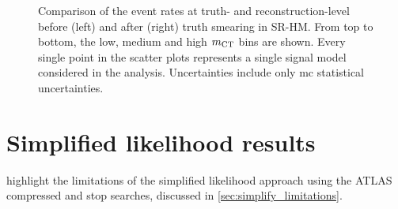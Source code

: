 \begin{figure}
\begin{subfigure}[b]{0.49\linewidth}
	\end{subfigure}
	\caption{Comparison of the event rates at truth- and reconstruction-level before (left) and after (right) truth smearing in SR-HM. From top to bottom, the low, medium and high $m_{\textrm{CT}}$ bins are shown. Every single point in the scatter plots represents a single signal model considered in the \onelepton analysis. Uncertainties include only \gls{mc} statistical uncertainties.}
	\label{fig:smearing_signal_regions_3}
\end{figure}


\FloatBarrier

\graphicspath{{chapter-simplify/Figs/Vector/}{chapter-simplify/Figs/}}

\section{Simplified likelihood results}


 highlight the limitations of the simplified likelihood approach using the ATLAS compressed and stop searches, discussed in \cref{sec:simplify_limitations}.

